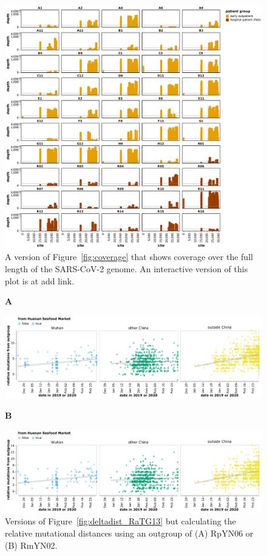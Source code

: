 \documentclass[9pt,twocolumn,twoside]{gsajnl_modified}
\begin{document}
\begin{figure}[h!]
\centering
\includegraphics[width=\linewidth]{figures/coverage_all.pdf}
\caption{A version of Figure~\ref{fig:coverage} that shows coverage over the full length of the SARS-CoV-2 genome.
An interactive version of this plot is at {\color{red} add link}.
}
\label{suppfig:coverage_all}
\end{figure}

\begin{figure}[h!]
{\bf \LARGE A} \\
\centerline{\includegraphics[width=\linewidth]{figures/deltadist_RpYN06.pdf}}
{\bf \LARGE B} \\
\centerline{\includegraphics[width=\linewidth]{figures/deltadist_RmYN02.pdf}}
\caption{Versions of Figure~\ref{fig:deltadist_RaTG13} but calculating the relative mutational distances using an outgroup of (A) RpYN06 or (B) RmYN02.
}
\label{suppfig:deltadist_RpYN06_RmYN02}
\end{figure}
\end{document}
